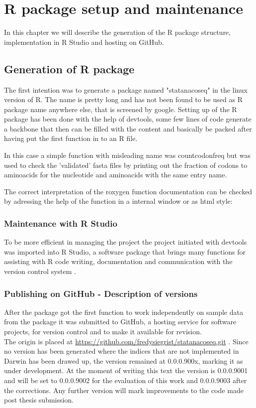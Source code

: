 \chapter{R package setup and maintenance}
In this chapter we will describe the generation of the R package structure, implementation in R Studio and hosting on GitHub.


\section{Generation of R package}
The first intention was to generate a package named "statanacoseq" in the linux version of R. The name is pretty long and has not been found to be used as R package name anywhere else, that is screened by google.
Setting up of the R package has been done with the help of devtools, some few lines of code generate a backbone that then can be filled with the content and basically be packed after having put the first function in to an R file. 

  

In this case a simple function with misleading name was countcodonfreq but was used to check the 'validated' fasta files by printing out the fraction of codons to aminoacids for the nucleotide and aminoacids with the same entry name. 
  
The correct interpretation of the roxygen function documentation can be checked by adressing the help of the function in a internal window or as html style:
  

\subsection{Maintenance with R Studio}
To be more efficient in managing the project the project initiated with devtools was imported into R Studio, a software package that brings many functions for assisting with R code writing, documentation and communication with the version control system \cite{Rstudio2015}. 

\subsection{Publishing on GitHub - Description of versions}
After the package got the first function to work independently on sample data from the package it was submitted to GitHub, a hosting service for software projects, for version control and to make it available for revision. \\
The origin is placed at \href{https://github.com/fredysiegrist/statanacoseq.git}{https://github.com/fredysiegrist/statanacoseq.git} \cite{Charles2013}. Since no version has been generated where the indices that are not implemented in Darwin has been drawed up, the version remained at 0.0.0.900x, marking it as under development. At the moment of writing this text the version is 0.0.0.9001 and will be set to 0.0.0.9002 for the evaluation of this work and 0.0.0.9003 after the corrections. Any further version will mark improvements to the code made post thesis submission.


